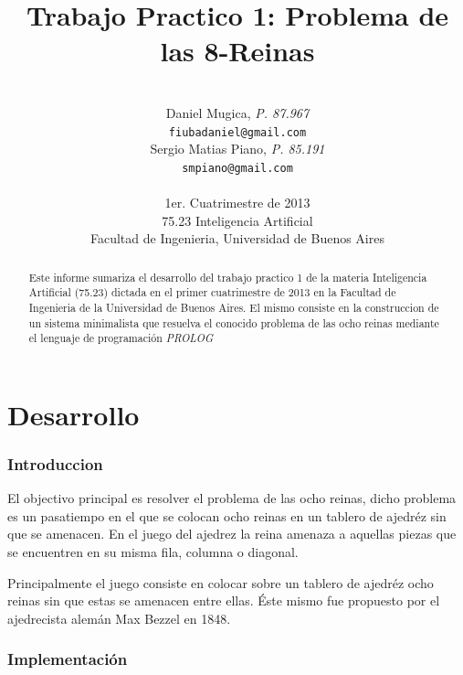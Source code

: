 \documentclass[a4paper,11pt]{article}
\title{\textbf{Trabajo Practico 1: Problema de las 8-Reinas}}
\author{\\
  Daniel Mugica, \textit{P. 87.967}                                \\
  \texttt{fiubadaniel@gmail.com}                                   \\ [2.5ex]
  Sergio Matias Piano, \textit{P. 85.191}                          \\
  \texttt{smpiano@gmail.com}                                       \\ [2.5ex]
                                                                   \\
  \normalsize{1er. Cuatrimestre de 2013}                           \\
  \normalsize{75.23 Inteligencia Artificial}                       \\
  \normalsize{Facultad de Ingenieria, Universidad de Buenos Aires} \\
}
\date{}
\begin{document}
\thispagestyle{empty}
\maketitle

\begin{abstract}

  Este informe sumariza el desarrollo del trabajo practico 1 de la materia
  Inteligencia Artificial (75.23) dictada en el primer cuatrimestre de
  2013 en la Facultad de Ingenieria de la Universidad de Buenos Aires. El mismo
  consiste en la construccion de un sistema minimalista que resuelva el 
  conocido problema de las ocho reinas mediante el lenguaje de programación
  \textit{PROLOG}

\end{abstract}

\clearpage

\tableofcontents
\clearpage


\part{Desarrollo}

\section{Introduccion}

  El objectivo principal es resolver el problema de las ocho reinas, dicho problema
  es un pasatiempo en el que se colocan ocho reinas en un tablero de ajedréz sin 
  que se amenacen. En el juego del ajedrez la reina amenaza a aquellas piezas que 
  se encuentren en su misma fila, columna o diagonal.
  
  Principalmente el juego consiste en colocar sobre un tablero de ajedréz ocho 
  reinas sin que estas se amenacen entre ellas. Éste mismo fue propuesto por 
  el ajedrecista alemán Max Bezzel en 1848.

\section{Implementación}
\end{document}
